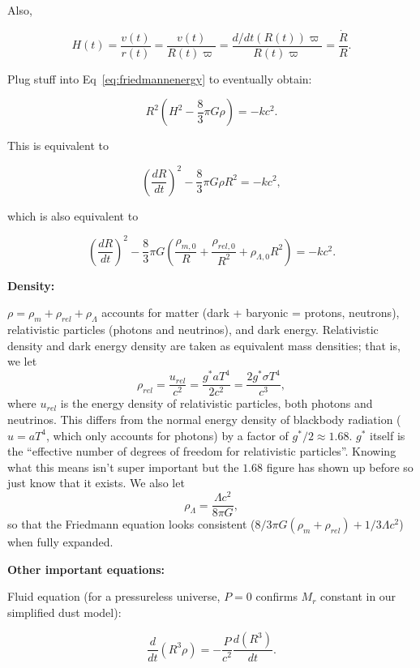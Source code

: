 \documentclass[12pt]{article}
\newcommand{\V}{

\vspace{\baselineskip}

}
\begin{document}
Also, 

\[H(t) = \frac{v(t)}{r(t)} = \frac{v(t)}{R(t)\varpi} = \frac{d/dt(R(t))\varpi}{R(t)\varpi} = \frac{\dot{R}}{R}.\]

Plug stuff into Eq~\ref{eq:friedmannenergy} to eventually obtain:

\begin{equation*}
R^{2}\left(H^{2} - \frac{8}{3}\pi G\rho \right) = -kc^{2}.
\end{equation*}

This is equivalent to 

\begin{equation*}
\left(\frac{dR}{dt}\right)^{2} - \frac{8}{3}\pi G\rho R^{2} = -kc^{2},
\end{equation*}

which is also equivalent to 

\begin{equation*}
\left(\frac{dR}{dt}\right)^{2} - \frac{8}{3}\pi G\left(\frac{\rho_{m,0}}{R} + \frac{\rho_{rel,0}}{R^{2}} +\rho_{\Lambda,0}R^{2}\right) = -kc^{2}.
\end{equation*}


\textbf{Density:}

$\rho = \rho_{m} + \rho_{rel} + \rho_{\Lambda}$ accounts for matter (dark + baryonic = protons, neutrons), relativistic particles (photons and neutrinos), and dark energy. Relativistic density and dark energy density are taken as equivalent mass densities; that is, we let 
\[\rho_{rel} = \frac{u_{rel}}{c^{2}} = \frac{g^{*}aT^{4}}{2c^{2}} = \frac{2g^{*}\sigma T^{4}}{c^{3}},\]
where $u_{rel}$ is the energy density of relativistic particles, both photons and neutrinos. This differs from the normal energy density of blackbody radiation ($u=aT^{4}$, which only accounts for photons) by a factor of $g^{*}/2\approx 1.68$. $g^{*}$ itself is the ``effective number of degrees of freedom for relativistic particles''. Knowing what this means isn't super important but the $1.68$ figure has shown up before so just know that it exists. We also let 
\[\rho_{\Lambda} = \frac{\Lambda c^{2}}{8\pi G},\]
so that the Friedmann equation looks consistent ($8/3\pi G(\rho_{m}+\rho_{rel}) + 1/3\Lambda c^{2}$) when fully expanded.\V

\textbf{Other important equations:}

Fluid equation (for a pressureless universe, $P=0$ confirms $M_{r}$ constant in our simplified dust model):

\[\frac{d}{dt}(R^{3}\rho) = -\frac{P}{c^{2}}\frac{d(R^{3})}{dt}.\]
\end{document}
